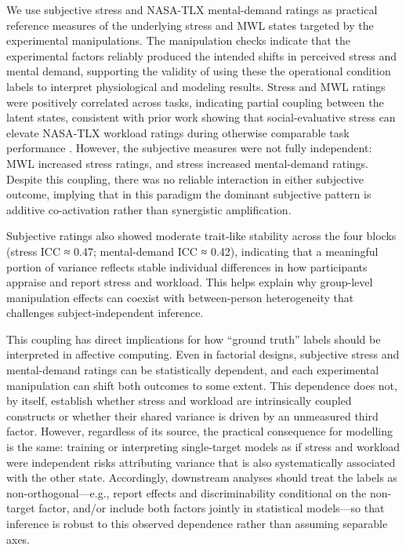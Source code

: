 \documentclass[lettersize,journal]{IEEEtran}
\begin{document}
We use subjective stress and NASA-TLX mental-demand ratings as practical reference measures of the underlying stress and MWL states targeted by the experimental manipulations. The manipulation checks indicate that the experimental factors reliably produced the intended shifts in perceived stress and mental demand, supporting the validity of using these the operational condition labels to interpret physiological and modeling results. Stress and MWL ratings were positively correlated across tasks, indicating partial coupling between the latent states, consistent with prior work showing that social-evaluative stress can elevate NASA‑TLX workload ratings during otherwise comparable task performance \cite{wetherell_psychobiological_2017}.
However, the subjective measures were not fully independent: MWL increased stress ratings, and stress increased mental-demand ratings. Despite this coupling, there was no reliable interaction in either subjective outcome, implying that in this paradigm the dominant subjective pattern is additive co-activation rather than synergistic amplification.

Subjective ratings also showed moderate trait-like stability across the four blocks (stress ICC ≈ 0.47; mental-demand ICC ≈ 0.42), indicating that a meaningful portion of variance reflects stable individual differences in how participants appraise and report stress and workload. This helps explain why group-level manipulation effects can coexist with between-person heterogeneity that challenges subject-independent inference.


This coupling has direct implications for how “ground truth” labels should be interpreted in affective computing. Even in factorial designs, subjective stress and mental-demand ratings can be statistically dependent, and each experimental manipulation can shift both outcomes to some extent. This dependence does not, by itself, establish whether stress and workload are intrinsically coupled constructs or whether their shared variance is driven by an unmeasured third factor. However, regardless of its source, the practical consequence for modelling is the same: training or interpreting single-target models as if stress and workload were independent risks attributing variance that is also systematically associated with the other state. Accordingly, downstream analyses should treat the labels as non-orthogonal—e.g., report effects and discriminability conditional on the non-target factor, and/or include both factors jointly in statistical models—so that inference is robust to this observed dependence rather than assuming separable axes.
\end{document}
